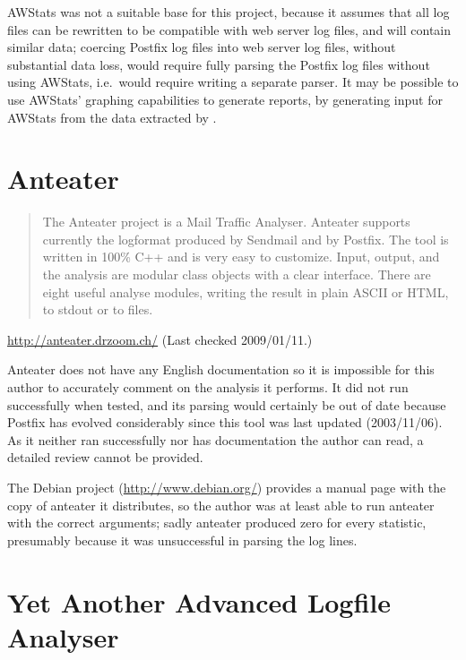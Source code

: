 AWStats was not a suitable base for this project, because it assumes that
all log files can be rewritten to be compatible with web server log files,
and will contain similar data; coercing Postfix log files into web server
log files, without substantial data loss, would require fully parsing the
Postfix log files without using AWStats, i.e.\ would require writing a
separate parser.  It may be possible to use AWStats' graphing capabilities
to generate reports, by generating input for AWStats from the data
extracted by \parsername{}.

\section{Anteater}

\begin{quotation}

    The Anteater project is a Mail Traffic Analyser. Anteater supports
    currently the logformat produced by Sendmail and by Postfix. The tool
    is written in 100\% C++ and is very easy to customize. Input, output,
    and the analysis are modular class objects with a clear interface.
    There are eight useful analyse modules, writing the result in plain
    ASCII or HTML, to stdout or to files.

\end{quotation}

\noindent{}\url{http://anteater.drzoom.ch/} \newline{}
(Last checked 2009/01/11.)

Anteater does not have any English documentation so it is impossible for
this author to accurately comment on the analysis it performs.  It did not
run successfully when tested, and its parsing would certainly be out of
date because Postfix has evolved considerably since this tool was last
updated (2003/11/06).  As it neither ran successfully nor has documentation
the author can read, a detailed review cannot be provided.

The Debian project (\url{http://www.debian.org/}) provides a manual page
with the copy of anteater it distributes, so the author was at least able
to run anteater with the correct arguments; sadly anteater produced zero
for every statistic, presumably because it was unsuccessful in parsing the
log lines.

\section{Yet Another Advanced Logfile Analyser}

